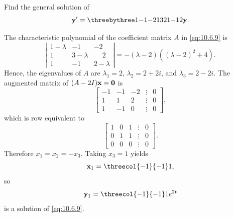 \setcounter{example}{3}
\setcounter{equation}{8}
\begin{example}
  \label{example:10.6.4} \rm Find the general solution of
  \begin{equation}
    \label{eq:10.6.9}{\bf y}'=\threebythree1{-1}{-2}1321{-1}2{\bf y}.
  \end{equation}
\end{example}
\begin{examplesolution}
\solution The characteristic polynomial of the coefficient matrix $A$ in \eqref{eq:10.6.9} is
\[
  \left|
  \begin{array}{ccc}
    1-\lambda & -1        & -2           \\
    1         & 3-\lambda & \phantom{-}2 \\
    1         & -1        & 2-\lambda
  \end{array}\right|= -(\lambda-2)\left((\lambda-2)^{2}+4\right).
\]
Hence, the eigenvalues of $A$ are $\lambda_{1}=2$, $\lambda_{2}=2+2i$, and $\lambda_{3}=2-2i$. The
augmented matrix of $(A-2I){\bf x=0}$ is
\[
  \left[
  \begin{array}{rrrcr}
    -1 & -1 & -2 & \vdots & 0 \\
    1  & 1  & 2  & \vdots & 0 \\
    1  & -1 & 0  & \vdots & 0
  \end{array}\right],
\]
which is row equivalent to
\[
  \left[
  \begin{array}{rrrcr}
    1 & 0 & 1 & \vdots & 0 \\
    0 & 1 & 1 & \vdots & 0 \\
    0 & 0 & 0 & \vdots & 0
  \end{array}\right].
\]
Therefore $x_{1}=x_{2}=-x_{3}$. Taking $x_{3}=1$ yields
\[
  {\bf x}_{1}=\threecol{-1}{-1}1,
\]
so
\[
  {\bf y}_{1}=\threecol{-1}{-1}1e^{2t}
\]
is a solution of \eqref{eq:10.6.9}.


\end{examplesolution}
